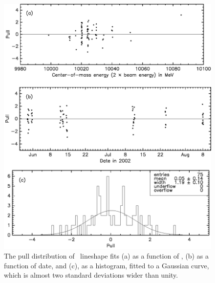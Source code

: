 \documentclass{cornell}
\begin{document}
\begin{figure}[p]
  \begin{center}
    \includegraphics[width=\linewidth]{pullstwo}
  \end{center}
  \caption[Pull distributions for \uss]{\label{pullstwo} The pull distribution of \uss\ lineshape
  fits (a) as a function of \ecm, (b) as a function of date, and (c),
  as a histogram, fitted to a Gaussian curve, which is almost two
  standard deviations wider than unity.}
\end{figure}
\end{document}
